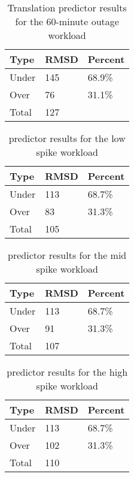 \begin{table}[H]
\centering
\begin{tabular}{| l | l | l |}
\hline
Type & RMSD & Percent \\ \hline
Under & 145 & 68.9\% \\ \hline
Over & 76 & 31.1\% \\ \hline
Total & 127 & \\ \hline
\end{tabular}
\caption{Translation predictor results for the 60-minute outage workload}
\end{table}


\begin{table}[H]
\centering
\begin{tabular}{| l | l | l |}
\hline
Type & RMSD & Percent \\ \hline
Under & 113 & 68.7\% \\ \hline
Over & 83 & 31.3\% \\ \hline
Total & 105 & \\ \hline
\end{tabular}
\caption{predictor results for the low spike workload}
\end{table}

\begin{table}[H]
\centering
\begin{tabular}{| l | l | l |}
\hline
Type & RMSD & Percent \\ \hline
Under & 113 & 68.7\% \\ \hline
Over & 91 & 31.3\% \\ \hline
Total & 107 & \\ \hline
\end{tabular}
\caption{predictor results for the mid spike workload}
\end{table}

\begin{table}[H]
\centering
\begin{tabular}{| l | l | l |}
\hline
Type & RMSD & Percent \\ \hline
Under & 113 & 68.7\% \\ \hline
Over & 102 & 31.3\% \\ \hline
Total & 110 & \\ \hline
\end{tabular}
\caption{predictor results for the high spike workload}
\end{table}